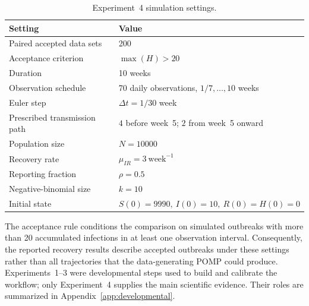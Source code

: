 \begin{table}[htbp]
\centering
\caption{Experiment~4 simulation settings.}
\label{tab:settings}
\begin{tabularx}{0.88\textwidth}{>{\raggedright\arraybackslash}p{}X}
\toprule
Setting & Value \\
\midrule
Paired accepted data sets & 200 \\
Acceptance criterion & \(\max(H)>20\) \\
Duration & 10 weeks \\
Observation schedule & 70 daily observations, \(1/7,\ldots,10\) weeks \\
Euler step & \(\Delta t=1/30\) week \\
Prescribed transmission path & \(4\) before week~5; \(2\) from week~5 onward \\
Population size & \(N=10000\) \\
Recovery rate & \(\mu_{IR}=3~\mathrm{week}^{-1}\) \\
Reporting fraction & \(\rho=0.5\) \\
Negative-binomial size & \(k=10\) \\
Initial state & \(S(0)=9990,\ I(0)=10,\ R(0)=H(0)=0\) \\
\bottomrule
\end{tabularx}
\end{table}

The acceptance rule conditions the comparison on simulated outbreaks with
more than 20 accumulated infections in at least one observation interval.
Consequently, the reported recovery results describe accepted outbreaks under
these settings rather than all trajectories that the data-generating POMP
could produce.  Experiments~1--3 were developmental steps used to build and
calibrate the workflow; only Experiment~4 supplies the main scientific
evidence.  Their roles are summarized in
Appendix~\ref{app:developmental}.
